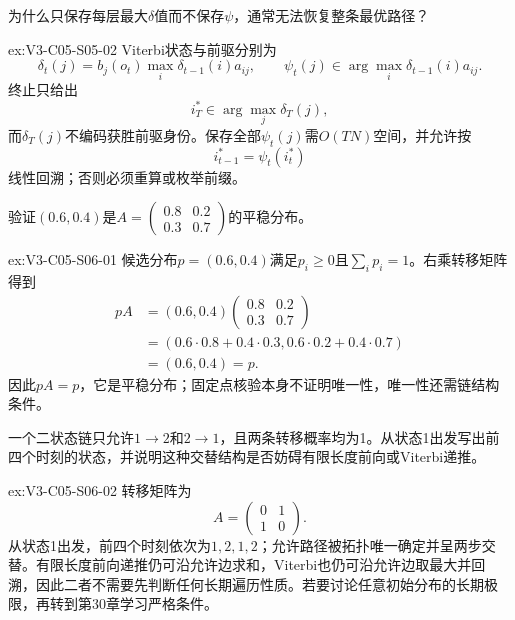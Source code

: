 \begin{SLChapterExercisePairSection}
\begin{exercise}\label{ex:V3-C05-S05-02}
为什么只保存每层最大$\delta$值而不保存$\psi$，通常无法恢复整条最优路径？
\end{exercise}
\ifSLFullEdition
{}\label{sol:V3-C05-S05-02}
\begin{chapterexercisesolution}{ex:V3-C05-S05-02}
Viterbi状态与前驱分别为
\[
\delta_t(j)=b_j(o_t)\max_i\delta_{t-1}(i)a_{ij},
\qquad
\psi_t(j)\in\arg\max_i\delta_{t-1}(i)a_{ij}.
\]
终止只给出
\[
i_T^*\in\arg\max_j\delta_T(j),
\]
而$\delta_T(j)$不编码获胜前驱身份。保存全部$\psi_t(j)$需$O(TN)$空间，并允许按
\[
i_{t-1}^*=\psi_t(i_t^*)
\]
线性回溯；否则必须重算或枚举前缀。
\end{chapterexercisesolution}
\fi

\begin{exercise}\label{ex:V3-C05-S06-01}
验证$(0.6,0.4)$是$A=\begin{pmatrix}0.8&0.2\\0.3&0.7\end{pmatrix}$的平稳分布。
\end{exercise}
\ifSLFullEdition
{}\label{sol:V3-C05-S06-01}
\begin{chapterexercisesolution}{ex:V3-C05-S06-01}
候选分布$p=(0.6,0.4)$满足$p_i\geq0$且$\sum_ip_i=1$。右乘转移矩阵得到
\[
\begin{aligned}
pA
&=(0.6,0.4)
\begin{pmatrix}0.8&0.2\\0.3&0.7\end{pmatrix}\\
&=(0.6\cdot0.8+0.4\cdot0.3,
0.6\cdot0.2+0.4\cdot0.7)\\
&=(0.6,0.4)=p.
\end{aligned}
\]
因此$pA=p$，它是平稳分布；固定点核验本身不证明唯一性，唯一性还需链结构条件。
\end{chapterexercisesolution}
\fi

\begin{exercise}\label{ex:V3-C05-S06-02}
一个二状态链只允许$1\to2$和$2\to1$，且两条转移概率均为1。从状态1出发写出前四个时刻的状态，并说明这种交替结构是否妨碍有限长度前向或Viterbi递推。
\end{exercise}
\ifSLFullEdition
{}\label{sol:V3-C05-S06-02}
\begin{chapterexercisesolution}{ex:V3-C05-S06-02}
转移矩阵为
\[
A=\begin{pmatrix}0&1\\1&0\end{pmatrix}.
\]
从状态1出发，前四个时刻依次为$1,2,1,2$；允许路径被拓扑唯一确定并呈两步交替。有限长度前向递推仍可沿允许边求和，Viterbi也仍可沿允许边取最大并回溯，因此二者不需要先判断任何长期遍历性质。若要讨论任意初始分布的长期极限，再转到第30章学习严格条件。
\end{chapterexercisesolution}
\fi


\end{SLChapterExercisePairSection}
